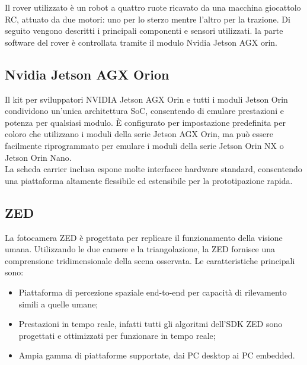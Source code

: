 Il rover utilizzato è un robot a quattro ruote ricavato da una macchina giocattolo RC, attuato da due motori: uno per lo sterzo mentre l'altro per la trazione. Di seguito vengono descritti i principali componenti e sensori utilizzati. la parte software del rover è controllata tramite il modulo Nvidia Jetson AGX orin.

\subsection{Nvidia Jetson AGX Orion}
Il kit per sviluppatori NVIDIA Jetson AGX Orin  \cite{Nvidia} e tutti i moduli Jetson Orin condividono un'unica architettura SoC, consentendo di emulare prestazioni e potenza per qualsiasi modulo. È configurato per impostazione predefinita per coloro che utilizzano i moduli della serie Jetson AGX Orin, ma può essere facilmente riprogrammato per emulare i moduli della serie Jetson Orin NX o Jetson Orin Nano. \\
La scheda carrier inclusa espone molte interfacce hardware standard, consentendo una piattaforma altamente flessibile ed estensibile per la prototipazione rapida.

\subsection{ZED}
La fotocamera ZED \cite{ZED} è progettata per replicare il funzionamento della visione umana. Utilizzando le due camere e la triangolazione, la ZED fornisce una comprensione tridimensionale della scena osservata.
Le caratteristiche principali sono:
\begin{itemize}
    \item Piattaforma di percezione spaziale end-to-end per capacità di rilevamento simili a quelle umane;
    \item Prestazioni in tempo reale, infatti tutti gli algoritmi dell'SDK ZED sono progettati e ottimizzati per funzionare in tempo reale;
    \item Ampia gamma di piattaforme supportate, dai PC desktop ai PC embedded.
\end{itemize}

